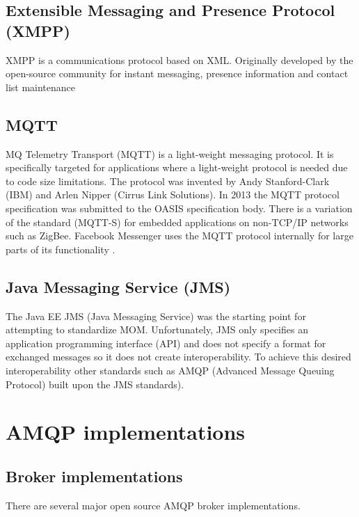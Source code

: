 \documentclass{thesis}
\begin{document}
\subsection{Extensible Messaging and Presence Protocol (XMPP)}
XMPP is a communications protocol based on XML.  Originally developed by the open-source community for instant messaging, presence information and contact list maintenance \cite{XMPP}  

\subsection{MQTT}
MQ Telemetry Transport (MQTT) is a light-weight messaging protocol.  It is specifically targeted for applications where a light-weight protocol is needed due to code size limitations.  The protocol was invented by Andy Stanford-Clark (IBM) and Arlen Nipper (Cirrus Link Solutions).  In 2013 the MQTT protocol specification was submitted to the OASIS specification body.  There is a variation of the standard (MQTT-S) for embedded applications on non-TCP/IP networks such as ZigBee.  Facebook Messenger uses the MQTT protocol internally for large parts of its functionality \cite{MQTT}. 

\subsection{Java Messaging Service (JMS)}
The Java EE JMS (Java Messaging Service) was the starting point for attempting to standardize MOM. Unfortunately, JMS only specifies an application programming interface (API) and does not specify a format for exchanged messages so it does not create interoperability.   To achieve this desired interoperability other standards such as AMQP (Advanced Message Queuing Protocol) built upon the JMS standards). 

\section{AMQP implementations}

\subsection{Broker implementations}
There are several major open source AMQP broker implementations.  
\end{document}

